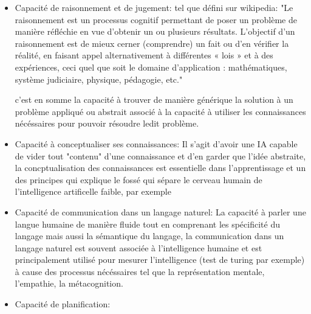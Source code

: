 \begin{itemize}
    \item Capacité de raisonnement et de jugement: \newline
    tel que défini sur wikipedia: "Le raisonnement est un processus cognitif permettant 
    de poser un problème de manière réfléchie en vue d'obtenir un ou plusieurs résultats. 
    L'objectif d'un raisonnement est de mieux cerner (comprendre) un fait ou d'en vérifier la réalité, 
    en faisant appel alternativement à différentes « lois » et à des expériences, 
    ceci quel que soit le domaine d'application : mathématiques, système judiciaire, 
    physique, pédagogie, etc." 
    \newline 

    c'est en somme la capacité à trouver de manière générique la solution à un problème appliqué 
    ou abstrait associé à la capacité à utiliser les connaissances nécéssaires pour pouvoir
    résoudre ledit problème. 
    \newline

    \item Capacité à conceptualiser ses connaissances: \newline
    Il s'agit d'avoir une IA capable de vider tout "contenu" d'une connaissance et d'en garder 
    que l'idée abstraite, la concptualisation des connaissances est essentielle dans l'apprentissage
    et un des principes qui explique le fossé qui sépare le cerveau humain de l'intelligence 
    artificelle faible, par exemple 
    \newline
    

    \item Capacité de communication dans un langage naturel: \newline 
    La capacité à parler une langue humaine de manière fluide 
    tout en comprenant les spécificité du langage mais aussi la sémantique du langage,
    la communication dans un langage naturel est souvent associée à l'intelligence humaine 
    et est principalement utilisé pour mesurer l'intelligence (test de turing par exemple)
    à cause des processus nécéssaires tel que la représentation mentale, l'empathie, 
    la métacognition. 
    \newline
    
    \item Capacité de planification: \newline

\end{itemize}


